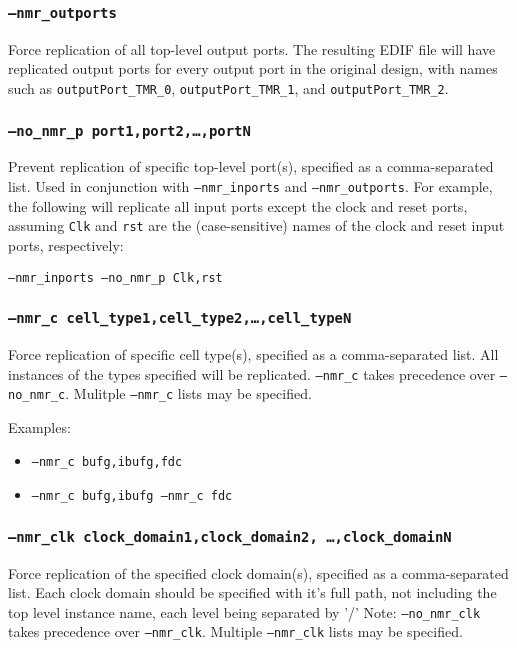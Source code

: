 \subsubsection{\texttt{--nmr\_outports}}
Force replication of all top-level output ports. The resulting EDIF file will
have replicated output ports for every output port in the original design, with
names such as \texttt{outputPort\_TMR\_0}, 
\texttt{outputPort\_TMR\_1}, and 
\texttt{outputPort\_TMR\_2}.

\subsubsection{\texttt{--no\_nmr\_p port1,port2,\ldots,portN}}
Prevent replication of specific top-level port(s), specified as a 
comma-separated list. Used in conjunction with \texttt{--nmr\_inports} and 
\texttt{--nmr\_outports}. For example, the following will replicate all input 
ports except the clock and reset ports, assuming \texttt{Clk} and \texttt{rst} 
are the (case-sensitive) names of the clock and reset input ports, respectively:

\texttt{--nmr\_inports --no\_nmr\_p Clk,rst}

\subsubsection{\texttt{--nmr\_c cell\_type1,cell\_type2,\ldots,cell\_typeN}}
Force replication of specific cell type(s), specified as a comma-separated list. 
All instances of the types specified will be replicated. \texttt{--nmr\_c}
takes precedence over \texttt{--no\_nmr\_c}. Mulitple \texttt{--nmr\_c} lists
may be specified.

Examples: 
\begin{itemize}
\item \texttt{--nmr\_c bufg,ibufg,fdc}
\item \texttt{--nmr\_c bufg,ibufg --nmr\_c fdc}
\end{itemize}

\subsubsection{\texttt{--nmr\_clk clock\_domain1,clock\_domain2,
\ldots,clock\_domainN}}
Force replication of the specified clock domain(s), specified as a
comma-separated list. Each clock domain should be specified with it's full
path, not including the top level instance name, each level being separated by '/' Note:
\texttt{--no\_nmr\_clk} takes precedence over \texttt{--nmr\_clk}. Multiple
\texttt{--nmr\_clk} lists may be specified.

